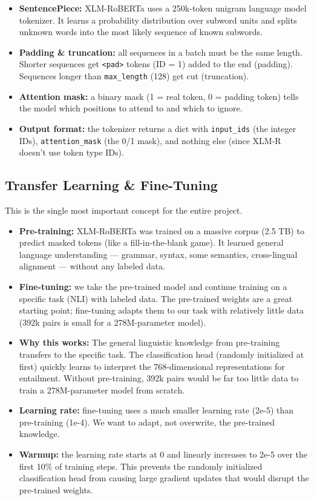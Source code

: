 \begin{itemize}[nosep]
    \item \textbf{SentencePiece:} XLM-RoBERTa uses a 250k-token unigram language model tokenizer. It learns a probability distribution over subword units and splits unknown words into the most likely sequence of known subwords.
    \item \textbf{Padding \& truncation:} all sequences in a batch must be the same length. Shorter sequences get \texttt{<pad>} tokens (ID = 1) added to the end (padding). Sequences longer than \texttt{max\_length} (128) get cut (truncation).
    \item \textbf{Attention mask:} a binary mask (1 = real token, 0 = padding token) tells the model which positions to attend to and which to ignore.
    \item \textbf{Output format:} the tokenizer returns a dict with \texttt{input\_ids} (the integer IDs), \texttt{attention\_mask} (the 0/1 mask), and nothing else (since XLM-R doesn't use token type IDs).
\end{itemize}

\subsection{Transfer Learning \& Fine-Tuning}

This is the single most important concept for the entire project.

\begin{itemize}[nosep]
    \item \textbf{Pre-training:} XLM-RoBERTa was trained on a massive corpus (2.5 TB) to predict masked tokens (like a fill-in-the-blank game). It learned general language understanding --- grammar, syntax, some semantics, cross-lingual alignment --- without any labeled data.
    \item \textbf{Fine-tuning:} we take the pre-trained model and continue training on a specific task (NLI) with labeled data. The pre-trained weights are a great starting point; fine-tuning adapts them to our task with relatively little data (392k pairs is small for a 278M-parameter model).
    \item \textbf{Why this works:} The general linguistic knowledge from pre-training transfers to the specific task. The classification head (randomly initialized at first) quickly learns to interpret the 768-dimensional representations for entailment. Without pre-training, 392k pairs would be far too little data to train a 278M-parameter model from scratch.
    \item \textbf{Learning rate:} fine-tuning uses a much smaller learning rate (2e-5) than pre-training (1e-4). We want to adapt, not overwrite, the pre-trained knowledge.
    \item \textbf{Warmup:} the learning rate starts at 0 and linearly increases to 2e-5 over the first 10\% of training steps. This prevents the randomly initialized classification head from causing large gradient updates that would disrupt the pre-trained weights.
\end{itemize}

